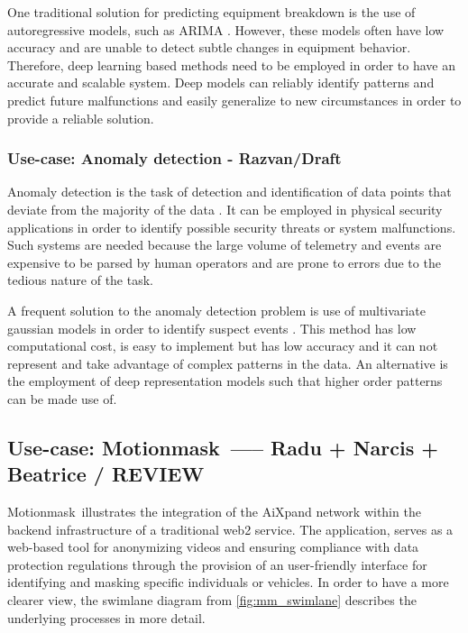 \documentclass{article}
\begin{document}
One traditional solution for predicting equipment breakdown is the use of autoregressive models, such as ARIMA \cite{kanawaday2017machine}. However, these models often have low accuracy and are unable to detect subtle changes in equipment behavior. Therefore, deep learning based methods \cite{zhao2019deep} need to be employed in order to have an accurate and scalable system. Deep models can reliably identify patterns and predict future malfunctions and easily generalize to new circumstances in order to provide a reliable solution.


\subsubsection{Use-case: Anomaly detection - Razvan/Draft}
Anomaly detection is the task of detection and identification of data points that deviate from the majority of the data \cite{chandola2009anomaly}. It can be employed in physical security applications in order to identify possible security threats or system malfunctions. Such systems are needed because the large volume of telemetry and events are expensive to be parsed by human operators and are prone to errors due to the tedious nature of the task. 

A frequent solution to the anomaly detection problem is use of multivariate gaussian models in order to identify suspect events \cite{mehrotra2017anomaly}. This method has low computational cost, is easy to implement but has low accuracy and it can not represent and take advantage of complex patterns in the data. An alternative is the employment of deep representation models \cite{chalapathy2019deep} such that higher order patterns can be made use of. 


\subsection{Use-case: Motionmask\texttrademark\ ----- Radu + Narcis + Beatrice / REVIEW}

Motionmask\texttrademark\ illustrates the integration of the AiXpand network within the backend infrastructure of a traditional web2 service. The application, serves as a web-based tool for anonymizing videos and ensuring compliance with data protection regulations through the provision of an user-friendly interface for identifying and masking specific individuals or vehicles. In order to have a more clearer view, the swimlane diagram from \figurename{\ref{fig:mm_swimlane}} describes the underlying processes in more detail.
\end{document}

